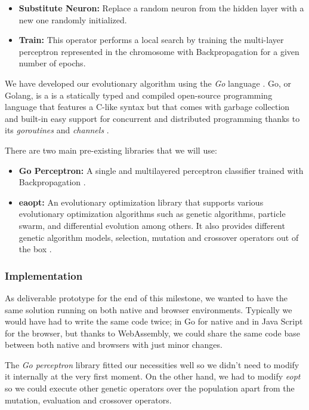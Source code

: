 \begin{itemize}
	\item \textbf{Substitute Neuron:} Replace a random neuron from the hidden layer with a new one randomly initialized.
	
	\item \textbf{Train:} This operator performs a local search by training the multi-layer perceptron represented in the chromosome with Backpropagation \cite{backpropagation} for a given number of epochs.
\end{itemize}

We have developed our evolutionary algorithm using the \textit{Go} language \cite{go}. Go, or Golang, is a is a statically typed and compiled open-source programming language that features a C-like syntax but that comes with garbage collection and built-in easy support for concurrent and distributed programming thanks to its \textit{goroutines} \cite{channels} and \textit{channels} \cite{channels}.

There are two main pre-existing libraries that we will use:

\begin{itemize}
	\item \textbf{Go Perceptron:} A single and multilayered perceptron classifier trained with Backpropagation \cite{go-perceptron-go}.
	\item \textbf{eaopt:} An evolutionary optimization library that supports various evolutionary optimization algorithms such as genetic algorithms, particle swarm, and differential evolution among others. It also provides different genetic algorithm models, selection, mutation and crossover operators out of the box \cite{eaopt}.
\end{itemize}

\subsubsection*{Implementation}
As deliverable prototype for the end of this milestone, we wanted to have the same solution running on both native and browser environments. Typically we would have had to write the same code twice; in Go for native and in Java Script for the browser, but thanks to WebAssembly, we could share the same code base between both native and browsers with just minor changes.

The \textit{Go perceptron} library fitted our necessities well so we didn't need to modify it internally at the very first moment. On the other hand, we had to modify \textit{eopt} so we could execute other genetic operators over the population apart from the mutation, evaluation and crossover operators.


